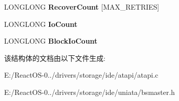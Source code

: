 \begin{DoxyCompactItemize}
L\+O\+N\+G\+L\+O\+NG {\bfseries Recover\+Count} \mbox{[}M\+A\+X\+\_\+\+R\+E\+T\+R\+I\+ES\mbox{]}
\item 
\mbox{\label{struct___h_w___l_u___e_x_t_e_n_s_i_o_n_ac5f5ddacccd6e648d7e32be8122e363d}} 
L\+O\+N\+G\+L\+O\+NG {\bfseries Io\+Count}
\item 
\mbox{\label{struct___h_w___l_u___e_x_t_e_n_s_i_o_n_ae6e1e31b1d8f8bb4944e76ff2a782b8c}} 
L\+O\+N\+G\+L\+O\+NG {\bfseries Block\+Io\+Count}
\end{DoxyCompactItemize}


该结构体的文档由以下文件生成\+:\begin{DoxyCompactItemize}
\item 
E\+:/\+React\+O\+S-\/0../drivers/storage/ide/atapi/atapi.\+c\item 
E\+:/\+React\+O\+S-\/0../drivers/storage/ide/uniata/bsmaster.\+h\end{DoxyCompactItemize}
